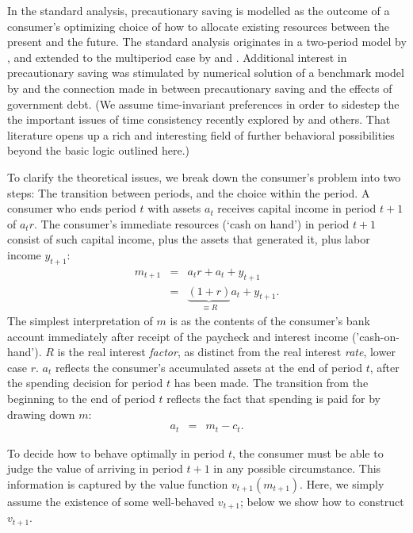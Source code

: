


In the standard analysis, precautionary saving is modelled as the outcome of a consumer's optimizing choice of
how to allocate existing resources between the present and the future.  
The standard analysis originates in a two-period model by \cite{LelandPrecaution}, and extended to the multiperiod case
by \cite{SibleyPIH} and \cite{MillerPIH}.
Additional interest in precautionary saving was stimulated by numerical solution
of a benchmark model by \cite{zeldesStochastic} and the connection made in \cite{barskymankiwzeldes:aer} between precautionary saving and
the effects of government debt.  %
(We assume time-invariant preferences in order to sidestep the the important issues
of time consistency recently explored by \cite{laibson:goldeneggs} and others.
That literature opens up a rich and interesting field of further behavioral possibilities
beyond the basic logic outlined here.)

To clarify the theoretical issues, we break down the consumer's
problem into two steps: The transition between periods, and the choice
within the period.  A consumer who ends period $t$ with assets
${a}_{t}$ receives capital income in period $t+1$ of ${a}_{t} r$.  The
consumer's immediate resources (`cash on hand') in period $t+1$ consist of such
capital income, plus the assets that generated it, plus labor income
${y}_{t+1}$:
\begin{eqnarray}
  \label{eq:mtp1}
  {m}_{t+1} & = & {a}_{t}r+{a}_{t}+{y}_{t+1}
\\ & = & \underbrace{(1+r)}_{\equiv R}{a}_{t}+{y}_{t+1}
.
\end{eqnarray}
The simplest interpretation of ${m}$ is as the contents of the
consumer's bank account immediately after receipt of the paycheck and
interest income ('cash-on-hand'). $R$ is the real interest {\em factor}, as distinct
from the real interest {\em rate}, lower case $r$.  ${a}_{t}$ reflects
the consumer's accumulated assets at the end of period $t$, after the
spending decision for period $t$ has been made.  The transition from
the beginning to the end of period $t$ reflects the fact that spending
is paid for by drawing down ${m}$:
\begin{eqnarray}
  {a}_{t} & = & {m}_{t}-{c}_{t}.
\end{eqnarray}

To decide how to behave optimally in period $t$, the consumer must be able to judge
the value of arriving in period $t+1$ in any possible circumstance.
This information is captured by the value function
${v}_{t+1}({m}_{t+1})$.  Here, we simply assume the existence of some
well-behaved ${v}_{t+1}$; below we show how to construct ${v}_{t+1}.$

